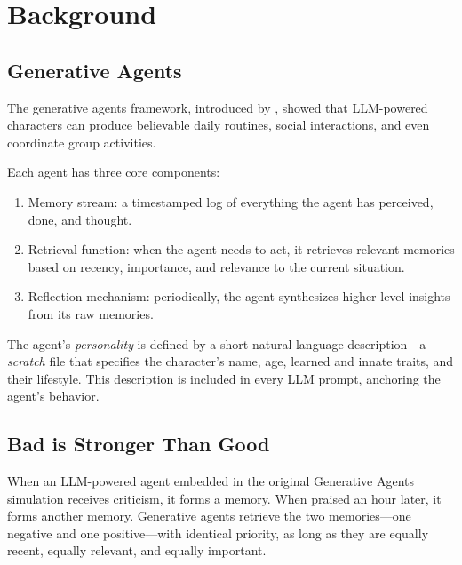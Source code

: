 \section{Background}

\subsection{Generative Agents}

The generative agents framework, introduced by \citet{park2023generative}, showed that LLM-powered characters can produce believable daily routines, social interactions, and even coordinate group activities.

Each agent has three core components:
\begin{enumerate}
    \item Memory stream: a timestamped log of everything the agent has perceived, done, and thought.
    \item Retrieval function: when the agent needs to act, it retrieves relevant memories based on recency, importance, and relevance to the current situation.
    \item Reflection mechanism: periodically, the agent synthesizes higher-level insights from its raw memories.
\end{enumerate}

The agent's \textit{personality} is defined by a short natural-language description---a {\em scratch} file that specifies the character's name, age, learned and innate traits, and their lifestyle. This description is included in every LLM prompt, anchoring the agent's behavior. 

\subsection{Bad is Stronger Than Good}

When an LLM-powered agent embedded in the original Generative Agents simulation receives criticism, it forms a memory. When praised an hour later, it forms another memory. Generative agents retrieve the two memories---one negative and one positive---with identical priority, as long as they are equally recent, equally relevant, and equally important. 

